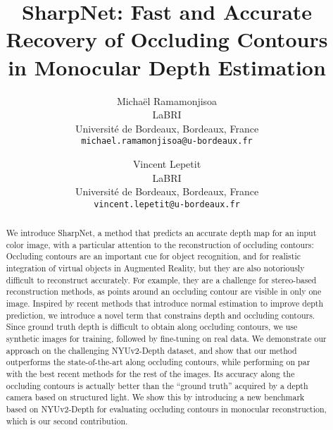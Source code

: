\documentclass[10pt,twocolumn,letterpaper]{article}
\begin{document}
\title{SharpNet: Fast and Accurate Recovery of Occluding Contours\\ in Monocular Depth Estimation}

\author{Micha\"el Ramamonjisoa\\
LaBRI\\
Universit\'e de Bordeaux, Bordeaux, France\\
{\tt\small michael.ramamonjisoa@u-bordeaux.fr}
\and
Vincent Lepetit\\
LaBRI\\
Universit\'e de Bordeaux, Bordeaux, France\\
{\tt\small vincent.lepetit@u-bordeaux.fr}
}

\maketitle



\begin{abstract}

We introduce SharpNet, a method that predicts an accurate depth map for an input
color  image, with  a particular  attention to  the reconstruction  of occluding
contours: Occluding  contours are an  important cue for object  recognition, and
for realistic integration of virtual objects  in Augmented Reality, but they are
also notoriously  difficult to reconstruct  accurately. For example, they  are a
challenge for stereo-based reconstruction methods, as points around an occluding
contour are visible in only one image. Inspired by recent methods that introduce
normal estimation  to improve depth prediction,  we introduce a novel  term that
constrains depth and occluding contours.   Since ground truth depth is difficult
to  obtain along  occluding  contours,  we use  synthetic  images for  training,
followed  by fine-tuning  on  real data.   We demonstrate  our  approach on  the
challenging  NYUv2-Depth  dataset, and  show  that  our method  outperforms  the
state-of-the-art along occluding contours, while performing on par with the best
recent methods  for the rest  of the images.   Its accuracy along  the occluding
contours is actually better than the ``ground truth'' acquired by a depth camera
based on structured light.  We show this by introducing a new benchmark based on
NYUv2-Depth for evaluating occluding contours in monocular reconstruction, which
is our second contribution.

\end{abstract}
\end{document}
